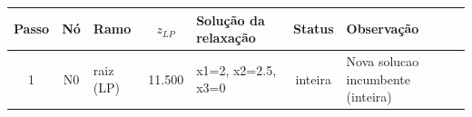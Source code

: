 \begin{footnotesize}
\begin{longtable}{c c l c l c p{4.2cm}}
\toprule
Passo & N\'o & Ramo & $z_{LP}$ & Solu\c{c}\~ao da relaxa\c{c}\~ao & Status & Observa\c{c}\~ao \\
\midrule
\endhead
1 & N0 & raiz (LP) & 11.500 & x1=2, x2=2.5, x3=0 & inteira & Nova solucao incumbente (inteira) \\
\bottomrule
\end{longtable}
\end{footnotesize}
